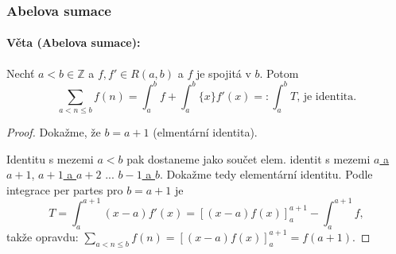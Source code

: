 \documentclass[10pt,a4paper]{article}
\newcommand{\Z}{{\mathbb{Z}}}
\begin{document}
\subsubsection{Abelova sumace}

\paragraph*{Věta (Abelova sumace):} Nechť $a < b \in \Z$ a $f, f' \in R(a, b)$ a $f$ je spojitá v $b$. 
Potom
\[
    \sum_{a<n\leq b}f(n) = \int_{a}^{b}f + \int_{a}^{b}\{x\} f'(x) =: \int_{a}^{b}T \text{, je identita.}
\]

\begin{proof}
    Dokažme, že $b = a + 1$ (elmentární identita).

    Identitu s mezemi $a < b$ pak dostaneme jako součet elem. identit s mezemi \underline{$a$ a $a + 1$}, \underline{$a + 1$ a $a + 2$} ... \underline{$b - 1$ a $b$}. 
    Dokažme tedy elementární identitu.
    Podle integrace per partes pro $b = a + 1$ je
\[
    T = \int_{a}^{a+1}(x-a)f'(x) = [(x-a)f(x)]_a^{a+1} - \int_{a}^{a+1}f,
\] takže opravdu: $\displaystyle \sum_{a<n\leq b}f(n) = [(x-a)f(x)]_a^{a+1} = f(a+1)$.
\end{proof}
\end{document}
